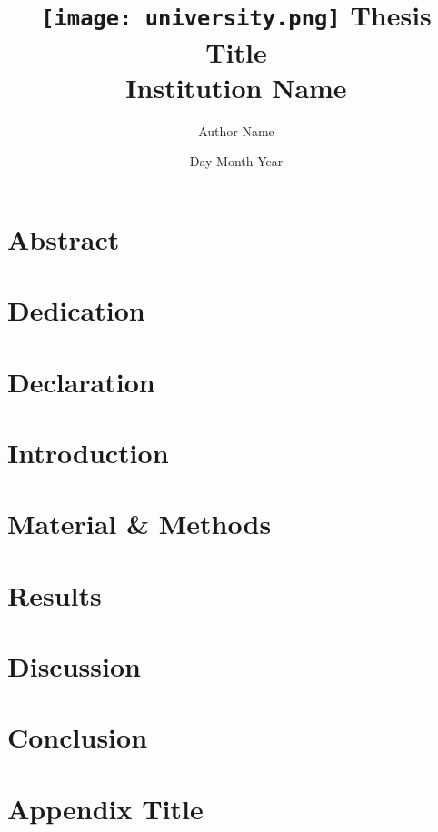 \documentclass[12pt]{report}
\title{
	{\texttt{[image: university.png]}}
	{Thesis Title}\\
	{\large Institution Name}\\
}
\author{Author Name}
\date{Day Month Year}
\begin{document}
\maketitle

\chapter*{Abstract}


\chapter*{Dedication}


\chapter*{Declaration}


\chapter*{Introduction}


\chapter*{Material \& Methods}


\chapter*{Results}


\chapter*{Discussion}


\chapter*{Conclusion}


\appendix
\chapter{Appendix Title}

\end{document}
